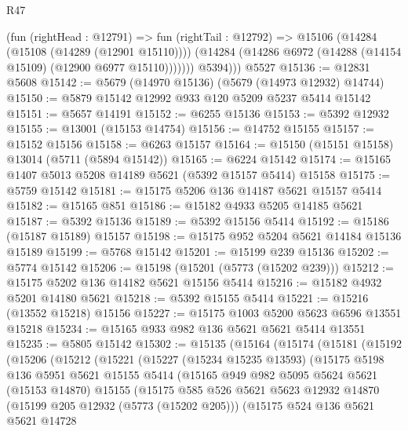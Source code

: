 \begin{lexlean}{R47}
\begin{coremodule}
            (fun (rightHead : @12791) =>
            fun (rightTail : @12792) =>
            @15106
              (@14284 (@15108 (@14289 (@12901 @15110))))
              (@14284 (@14286 @6972 (@14288 (@14154 @15109) (@12900 @6977 @15110)))))))
          @5394)))
    @5527
@15136 := @12831 @5608
@15142 := @5679 (@14970 @15136) (@5679 (@14973 @12932) @14744)
@15150 := @5879 @15142 @12992 @933 @120 @5209 @5237 @5414 @15142
@15151 := @5657 @14191
@15152 := @6255 @15136
@15153 := @5392 @12932
@15155 := @13001 (@15153 @14754)
@15156 := @14752 @15155
@15157 := @15152 @15156
@15158 := @6263 @15157
@15164 := @15150 (@15151 @15158) @13014 (@5711 (@5894 @15142))
@15165 := @6224 @15142
@15174 := @15165 @1407 @5013 @5208 @14189 @5621 (@5392 @15157 @5414) @15158
@15175 := @5759 @15142
@15181 := @15175 @5206 @136 @14187 @5621 @15157 @5414
@15182 := @15165 @851
@15186 := @15182 @4933 @5205 @14185 @5621
@15187 := @5392 @15136
@15189 := @5392 @15156 @5414
@15192 := @15186 (@15187 @15189) @15157
@15198 := @15175 @952 @5204 @5621 @14184 @15136 @15189
@15199 := @5768 @15142
@15201 := @15199 @239 @15136
@15202 := @5774 @15142
@15206 := @15198 (@15201 (@5773 (@15202 @239)))
@15212 := @15175 @5202 @136 @14182 @5621 @15156 @5414
@15216 := @15182 @4932 @5201 @14180 @5621
@15218 := @5392 @15155 @5414
@15221 := @15216 (@13552 @15218) @15156
@15227 := @15175 @1003 @5200 @5623 @6596 @13551 @15218
@15234 := @15165 @933 @982 @136 @5621 @5621 @5414 @13551
@15235 := @5805 @15142
@15302 := @15135
    (@15164
      (@15174
        (@15181
          (@15192
            (@15206
              (@15212
                (@15221
                  (@15227
                    (@15234 @15235 @13593)
                    (@15175
                      @5198
                      @136
                      @5951
                      @5621
                      @15155
                      @5414
                      (@15165
                        @949
                        @982
                        @5095
                        @5624
                        @5621
                        (@15153 @14870)
                        @15155
                        (@15175
                          @585
                          @526
                          @5621
                          @5623
                          @12932
                          @14870
                          (@15199 @205 @12932 (@5773 (@15202 @205)))
                          (@15175
                            @524
                            @136
                            @5621
                            @5621
                            @14728

\end{coremodule}
\end{lexlean}
